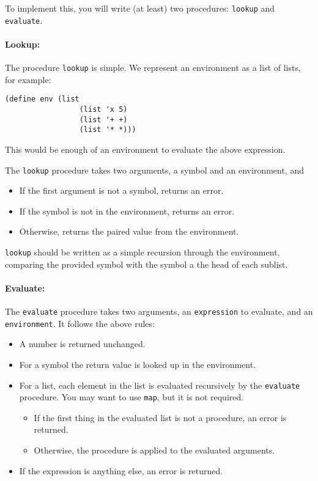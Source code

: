 \documentclass{article}
\begin{document}
To implement this,  you will write (at least) two procedures:
          {\tt lookup} and {\tt evaluate}.

\paragraph{Lookup:}
The procedure {\tt lookup} is simple.  We represent an environment as
a list of lists, for example:
\begin{Verbatim}[frame=single]
  (define env (list
                 (list 'x 5)
                 (list '+ +)
                 (list '* *)))
\end{Verbatim}
This would be enough of an environment to evaluate the above
expression.

The {\tt lookup} procedure takes two arguments, a symbol and an
environment, and
\begin{itemize}
\item If the first argument is not a symbol, returns an error.
\item If the symbol is not in the environment, returns an error.
\item Otherwise, returns the paired value from the environment.
\end{itemize}
{\tt lookup} should be written as a simple recursion through the
environment, comparing the provided symbol with the symbol a the head
of each sublist.
  
\paragraph{Evaluate:}
The {\tt evaluate} procedure takes two arguments, an {\tt expression} to
evaluate, and an {\tt environment}.  It follows the above rules:
\begin{itemize}
\item A number is returned unchanged.
\item For a symbol the return value is looked up in the environment.
\item For a list, each element in the list is evaluated recursively by
  the {\tt evaluate} procedure.  You may
  want to use {\tt map}, but it is not required.
  \begin{itemize}
  \item If the first thing in the evaluated list is not a procedure,
    an error is returned.
  \item Otherwise, the procedure is applied to the evaluated
    arguments.
  \end{itemize}
\item If the expression is anything else, an error is returned.
\end{itemize}
\end{document}
